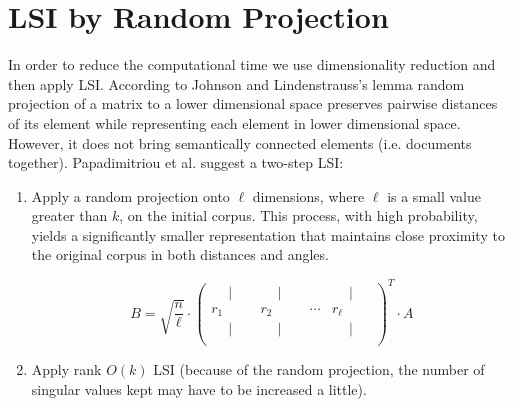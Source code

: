 \documentclass[a4paper,11pt,DIV=15]{scrartcl} %
\theoremstyle{plain}
\theoremstyle{definition}
\begin{document}
\section{LSI by Random Projection} \label{LSI by Random Projection} %
In order to reduce the computational time we use dimensionality reduction and then apply LSI.
According to Johnson and Lindenstrauss's lemma \cite{johnson1984Lindenstrauss}  random projection of a matrix to a lower dimensional space preserves pairwise distances of its element while representing each element in lower dimensional space. However, it does not bring semantically connected elements (i.e. documents together).  Papadimitriou et al. suggest a two-step LSI:
\begin{enumerate}
    \item 
Apply a random projection onto $\ell$ dimensions, where $\ell$ is a small value greater than $k$, on the initial corpus. This process, with high probability, yields a significantly smaller representation that maintains close proximity to the original corpus in both distances and angles.


\begin{equation}
    B = 
\sqrt{\dfrac{n}{\ell}}
\cdot
\begin{pmatrix}
    \phantom{-} \big\lvert \phantom{-} & \phantom{-} \vert \phantom{-} & & \phantom{-} \vert \phantom{-} \\
    r_1 & r_2 & \cdots & r_{\ell} \\
    \phantom{-} \vert \phantom{-} & \phantom{-} \vert \phantom{-} & & \phantom{-} \vert \phantom{-} \\
\end{pmatrix}^T
\cdot
A
\label{eq:matrixB}
\end{equation}

\item Apply rank $O(k)$ LSI (because of the random projection, the number of
singular values kept may have to be increased a little).
\end{enumerate}
\end{document}
